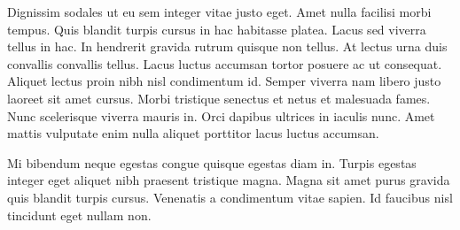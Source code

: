 \documentclass{article}
\begin{document}
Dignissim sodales ut eu sem integer vitae justo eget. Amet nulla facilisi morbi tempus. Quis blandit turpis cursus in hac habitasse platea. Lacus sed viverra tellus in hac. In hendrerit gravida rutrum quisque non tellus. At lectus urna duis convallis convallis tellus. Lacus luctus accumsan tortor posuere ac ut consequat. Aliquet lectus proin nibh nisl condimentum id. Semper viverra nam libero justo laoreet sit amet cursus. Morbi tristique senectus et netus et malesuada fames. Nunc scelerisque viverra mauris in. Orci dapibus ultrices in iaculis nunc. Amet mattis vulputate enim nulla aliquet porttitor lacus luctus accumsan.

Mi bibendum neque egestas congue quisque egestas diam in. Turpis egestas integer eget aliquet nibh praesent tristique magna. Magna sit amet purus gravida quis blandit turpis cursus. Venenatis a condimentum vitae sapien. Id faucibus nisl tincidunt eget nullam non. 
\end{document}
